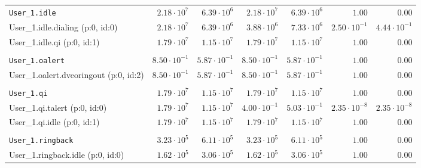 \begin{table}[htbp]
{\begin{tabular}{lrrrrrr}
\\[-8pt]\texttt{User\_1.idle}                        &  $2.18 \cdot 10^{7}$ &  $6.39 \cdot 10^{6}$ &  $2.18 \cdot 10^{7}$ &  $6.39 \cdot 10^{6}$ &               $1.00$ &               $0.00$ \\
\hspace{3mm}User\_1.idle.dialing (p:0, id:0)         &  $2.18 \cdot 10^{7}$ &  $6.39 \cdot 10^{6}$ &  $3.88 \cdot 10^{6}$ &  $7.33 \cdot 10^{6}$ & $2.50 \cdot 10^{-1}$ & $4.44 \cdot 10^{-1}$ \\
\hspace{3mm}User\_1.idle.qi (p:0, id:1)              &  $1.79 \cdot 10^{7}$ &  $1.15 \cdot 10^{7}$ &  $1.79 \cdot 10^{7}$ &  $1.15 \cdot 10^{7}$ &               $1.00$ &               $0.00$ \\
\\[-8pt]\texttt{User\_1.oalert}                      & $8.50 \cdot 10^{-1}$ & $5.87 \cdot 10^{-1}$ & $8.50 \cdot 10^{-1}$ & $5.87 \cdot 10^{-1}$ &               $1.00$ &               $0.00$ \\
\hspace{3mm}User\_1.oalert.dveoringout (p:0, id:2)   & $8.50 \cdot 10^{-1}$ & $5.87 \cdot 10^{-1}$ & $8.50 \cdot 10^{-1}$ & $5.87 \cdot 10^{-1}$ &               $1.00$ &               $0.00$ \\
\\[-8pt]\texttt{User\_1.qi}                          &  $1.79 \cdot 10^{7}$ &  $1.15 \cdot 10^{7}$ &  $1.79 \cdot 10^{7}$ &  $1.15 \cdot 10^{7}$ &               $1.00$ &               $0.00$ \\
\hspace{3mm}User\_1.qi.talert (p:0, id:0)            &  $1.79 \cdot 10^{7}$ &  $1.15 \cdot 10^{7}$ & $4.00 \cdot 10^{-1}$ & $5.03 \cdot 10^{-1}$ & $2.35 \cdot 10^{-8}$ & $2.35 \cdot 10^{-8}$ \\
\hspace{3mm}User\_1.qi.idle (p:0, id:1)              &  $1.79 \cdot 10^{7}$ &  $1.15 \cdot 10^{7}$ &  $1.79 \cdot 10^{7}$ &  $1.15 \cdot 10^{7}$ &               $1.00$ &               $0.00$ \\
\\[-8pt]\texttt{User\_1.ringback}                    &  $3.23 \cdot 10^{5}$ &  $6.11 \cdot 10^{5}$ &  $3.23 \cdot 10^{5}$ &  $6.11 \cdot 10^{5}$ &               $1.00$ &               $0.00$ \\
\hspace{3mm}User\_1.ringback.idle (p:0, id:0)        &  $1.62 \cdot 10^{5}$ &  $3.06 \cdot 10^{5}$ &  $1.62 \cdot 10^{5}$ &  $3.06 \cdot 10^{5}$ &               $1.00$ &               $0.00$ \\

\end{tabular}}
\end{table}
